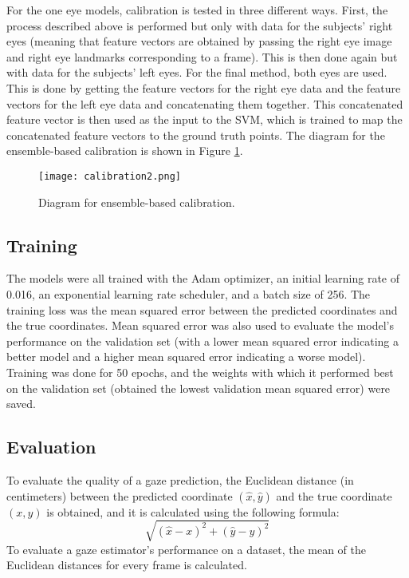 \documentclass{article}
\begin{document}
For the one eye models, calibration is tested in three different ways. First, the process described above is performed but only with data for the subjects' right eyes (meaning that feature vectors are obtained by passing the right eye image and right eye landmarks corresponding to a frame). This is then done again but with data for the subjects' left eyes. For the final method, both eyes are used. This is done by getting the feature vectors for the right eye data and the feature vectors for the left eye data and concatenating them together. This concatenated feature vector is then used as the input to the SVM, which is trained to map the concatenated feature vectors to the ground truth points. The diagram for the ensemble-based calibration is shown in Figure \ref{fig:calibration}.

\begin{figure}
  \texttt{[image: calibration2.png]}
  \caption{Diagram for ensemble-based calibration.}
  \label{fig:calibration}
\end{figure}

\subsection{Training}
The models were all trained with the Adam optimizer, an initial learning rate of 0.016, an exponential learning rate scheduler, and a batch size of 256. The training loss was the mean squared error between the predicted coordinates and the true coordinates. Mean squared error was also used to evaluate the model's performance on the validation set (with a lower mean squared error indicating a better model and a higher mean squared error indicating a worse model). Training was done for 50 epochs, and the weights with which it performed best on the validation set (obtained the lowest validation mean squared error) were saved.

\subsection{Evaluation}
To evaluate the quality of a gaze prediction, the Euclidean distance (in centimeters) between the predicted coordinate \((\hat{x}, \hat{y})\) and the true coordinate \((x, y)\) is obtained, and it is calculated using the following formula: \[\sqrt{(\hat{x} - x)^2 + (\hat{y} - y)^2}\]
To evaluate a gaze estimator's performance on a dataset, the mean of the Euclidean distances for every frame is calculated.
\end{document}
